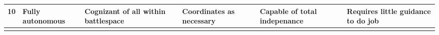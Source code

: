 \begin{table}
\begin{tabular}{r L{0.1\textwidth} L{0.175\textwidth} L{0.175\textwidth} L{0.175\textwidth} L{0.175\textwidth}}
        10  & Fully autonomous                              & Cognizant of all within battlespace                                                                                                                           & Coordinates as necessary                                                                                                                                                                                                      & Capable of total indepenance                                                                                                                  & Requires little guidance to do job \\
        \bottomrule\\
        \end{tabular}
\end{table}
